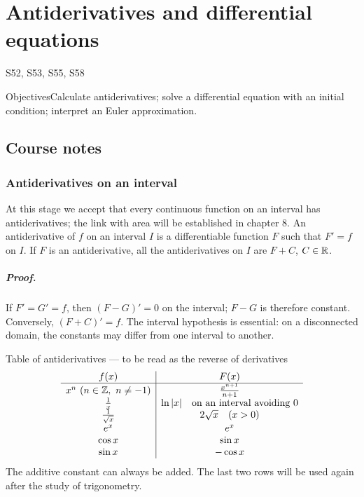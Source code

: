 \setcounter{chapter}{6}\chapter{Antiderivatives and differential equations}\label{ch:7}

{\small\sffamily\color{teal}S52, S53, S55, S58\par}

\begin{retenir}{Objectives}Calculate antiderivatives; solve a differential equation with an initial condition; interpret an Euler approximation.\end{retenir}

\section{Course notes}
\subsection{Antiderivatives on an interval}
At this stage we accept that every continuous function on an interval has antiderivatives; the link with area will be established in chapter 8.
An antiderivative of $f$ on an interval $I$ is a differentiable function $F$ such that $F'=f$ on $I$. If $F$ is an antiderivative, all the antiderivatives on $I$ are $F+C$, $C\in\mathbb R$.
\paragraph{Proof.} If $F'=G'=f$, then $(F-G)'=0$ on the interval; $F-G$ is therefore constant. Conversely, $(F+C)'=f$. The interval hypothesis is essential: on a disconnected domain, the constants may differ from one interval to another.
\begin{retenir}{Table of antiderivatives --- to be read as the reverse of derivatives}
\[\begin{array}{c|c}
f(x)&F(x)\\\hline
x^n\ (n\in\mathbb Z,\ n\ne-1)&\frac{x^{n+1}}{n+1}\\
\frac{1}{x}&\ln|x|\quad\text{on an interval avoiding }0\\
\frac{1}{\sqrt{x}}&2\sqrt{x}\quad(x>0)\\
e^x&e^x\\
\cos x&\sin x\\
\sin x&-\cos x
\end{array}\]
The additive constant can always be added. The last two rows will be used again after the study of trigonometry.
\end{retenir}

